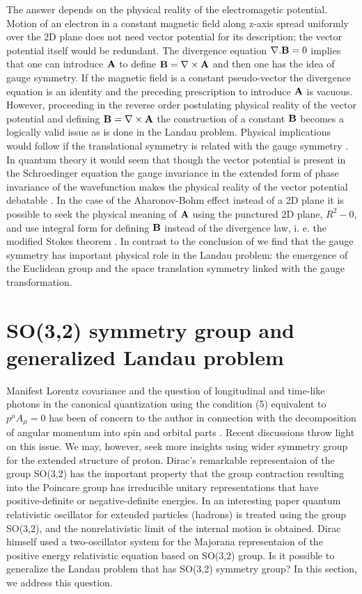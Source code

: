 \documentclass[aps, singlecolumn, showpacs]{revtex4-2}
\begin{document}
The answer depends on the physical reality of the electromagetic potential. Motion of an electron in a constant magnetic field along z-axis spread uniformly over the 2D plane does not need vector potential for its description; the vector potential itself would be redundant. The divergence equation  ${\bf \nabla}.{\bf B} =0$ implies that one can introduce ${\bf A}$ to define ${\bf B} = {\bf \nabla} \times {\bf A}$ and then one has the idea of gauge symmetry. If the magnetic field is a constant pseudo-vector the divergence equation is an identity and the preceding prescription to introduce ${\bf A}$ is vacuous. However, proceeding in the reverse order postulating physical reality of the vector potential and defining ${\bf B} = {\bf \nabla} \times {\bf A}$ the construction of a constant ${\bf B}$ becomes a logically valid issue as is done in the Landau problem. Physical implications would follow if the translational symmetry is related with the gauge symmetry \cite{14,16}. In quantum theory it would seem that though the vector potential is present in the Schroedinger equation the gauge invariance in the extended form of phase invariance of the wavefunction makes the physical reality of the vector potential debatable \cite{27, 28}. In the case of the Aharonov-Bohm effect \cite{27} instead of a 2D plane it is possible to seek the physical meaning of ${\bf A}$ using the punctured 2D plane, $R^2 -{0}$, and use integral form for defining ${\bf B}$ instead of the divergence law, i. e. the modified Stokes theorem \cite{28}. In contrast to the conclusion of \cite{8} we find that the gauge symmetry has important physical role in the Landau problem: the emergence of the Euclidean group and the space translation symmetry linked with the gauge transformation.

\section{\bf SO(3,2) symmetry group and generalized Landau problem}

Manifest Lorentz covariance and the question of longitudinal and time-like photons in the canonical quantization using the condition (5) equivalent to $p^\mu A_\mu =0$ has been of concern to the author in connection with the decomposition of angular momentum into spin and orbital parts \cite{2}. Recent discussions \cite{12,13} throw light on this issue. We may, however, seek more insights using wider symmetry group for the extended structure of proton. Dirac's remarkable representaion of the group SO(3,2) \cite{15} has the important property that the group contraction resulting into the Poincare group has irreducible unitary representations that have positive-definite or negative-definite energies. In an interesting paper \cite{29} quantum relativistic oscillator for extended particles (hadrons) is treated using the group SO(3,2), and the nonrelativistic limit of the internal motion is obtained. Dirac himself used a two-oscillator system for the Majorana representaion of the positive energy relativistic equation \cite{30, 31} based on SO(3,2) group. Is it possible to generalize the Landau problem that has SO(3,2) symmetry group? In this section, we address this question. 
\end{document}
